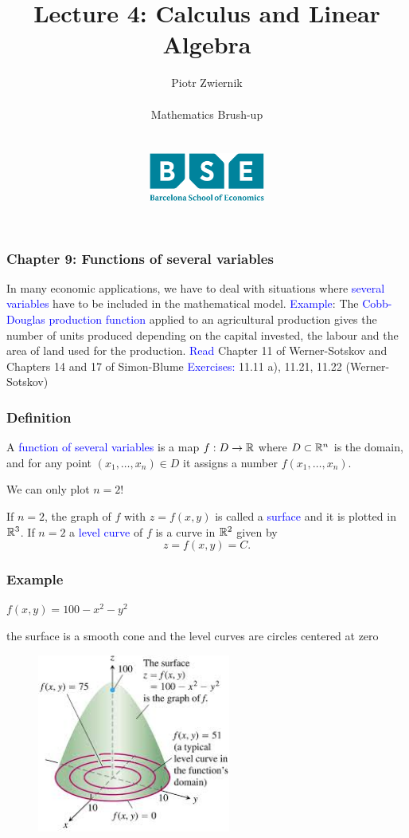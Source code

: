 \documentclass[11pt,aspectratio=169]{beamer}
\title[Calculus and Linear Algebra]{Lecture 4: Calculus and Linear Algebra}
\author[Piotr Zwiernik, Barcelona School of Economics]{Piotr Zwiernik \\ $\;$\\
Mathematics Brush-up\\ $\;$\\ $\;$\\
\includegraphics[width=1.5in]{img/bse.png}  
}
\date{}
\begin{document}
\begin{frame}
\titlepage
\end{frame}


\begin{frame}
\frametitle{Chapter 9: Functions of several variables}
\begin{small}
In many economic applications, we have to deal with situations where \textcolor{blue}{several variables} have to be included in the mathematical model. 
\vskip 12pt
\textcolor{blue}{Example}: The \textcolor{blue}{Cobb-Douglas production function} applied to an agricultural production gives the number of units produced depending on the capital invested, the labour and the area of land used for the production.
\vskip 12pt
\textcolor{blue}{Read}  Chapter 11 of Werner-Sotskov and Chapters 14 and 17 of Simon-Blume
\vskip 12pt
\textcolor{blue}{Exercises:} 11.11 a), 11.21, 11.22 (Werner-Sotskov)


\end{small}
\end{frame}



\begin{frame}
\frametitle{Definition}
\begin{small}
A \textcolor{blue}{function of several variables} is a map $f: D \rightarrow \mathbb R$ where $D \subset \mathbb R^n$ is the domain, and for any point $(x_1,\dots,x_n)\in D$ it assigns a number
$f(x_1,\dots,x_n)$.

\begin{tiny}We can only plot $n=2$!\end{tiny}
\vskip 10pt
If $n=2$, the graph of $f$ with $z=f(x,y)$ is called a \textcolor{blue}{surface} and it is plotted in $\mathbb R^3$.
\vskip 12pt
If $n=2$ a \textcolor{blue}{level curve} of $f$ is a curve in $\mathbb R^2$ given by $$z=f(x,y)=C.$$





\end{small}
\end{frame}



\begin{frame}
\frametitle{Example}
\begin{small} $f(x,y)=100-x^2-y^2$\end{small} \begin{tiny}the surface is a smooth cone and the level curves are circles centered at zero\end{tiny}
\begin{figure}
\includegraphics[width=2.5in]{img/level_curve} 
\end{figure}
\end{frame}
\end{document}
